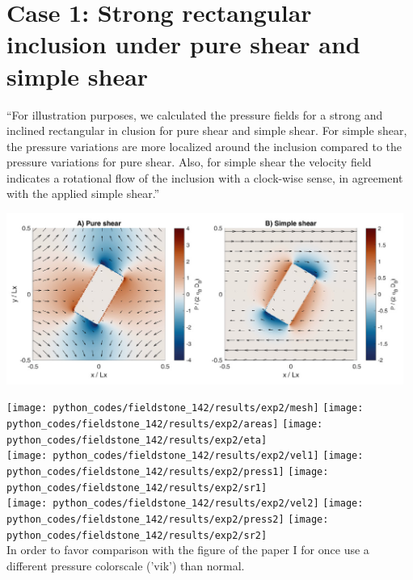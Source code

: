 \section*{Case 1: Strong rectangular inclusion under pure shear and simple shear}

``For illustration purposes, we calculated the pressure fields for a strong and inclined rectangular in­
clusion for pure shear and simple shear. For simple shear, the
pressure variations are more localized around the inclusion compared to
the pressure variations for pure shear. Also, for simple shear the velocity
field indicates a rotational flow of the inclusion with a clock-wise sense,
in agreement with the applied simple shear.''

\begin{center}
\includegraphics[width=13cm]{python_codes/fieldstone_142/images/hams22_c}\\
\end{center}

\begin{center}
\texttt{[image: python\_codes/fieldstone\_142/results/exp2/mesh]}
\texttt{[image: python\_codes/fieldstone\_142/results/exp2/areas]}
\texttt{[image: python\_codes/fieldstone\_142/results/exp2/eta]}\\
\texttt{[image: python\_codes/fieldstone\_142/results/exp2/vel1]}
\texttt{[image: python\_codes/fieldstone\_142/results/exp2/press1]}
\texttt{[image: python\_codes/fieldstone\_142/results/exp2/sr1]}\\
\texttt{[image: python\_codes/fieldstone\_142/results/exp2/vel2]}
\texttt{[image: python\_codes/fieldstone\_142/results/exp2/press2]}
\texttt{[image: python\_codes/fieldstone\_142/results/exp2/sr2]}\\
{\captionfont In order to favor comparison with the figure of the paper I for once
use a different pressure colorscale ('vik') than normal.}
\end{center}

